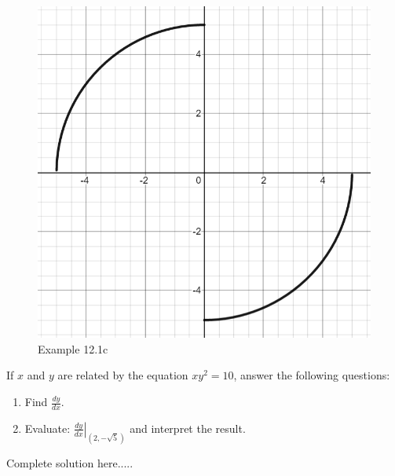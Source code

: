 \vspace{1cm}
      \begin{figure}[h!]
 \centering
    \includegraphics[scale=0.45]{images/implicitDiff/implicit12_1c.PNG}
    \caption{Example 12.1c}
    \end{figure}
\newpage
\begin{example}
 If $x$ and $y$ are related by the equation $xy^2=10$, answer the following questions:
\renewcommand{\labelenumi}{\textbf{(\alph{enumi})}}
\begin{enumerate}[leftmargin=*]
    \item Find $\displaystyle\frac{dy}{dx}$.
    \item Evaluate: $\left.\displaystyle\frac{dy}{dx}\right\rvert_{(2,-\sqrt{5})}$ and interpret the result.
\end{enumerate}
    \begin{sol}
    \end{sol}
    \begin{solL}
    Complete solution here.....
    
    \end{solL}
    
\end{example}
